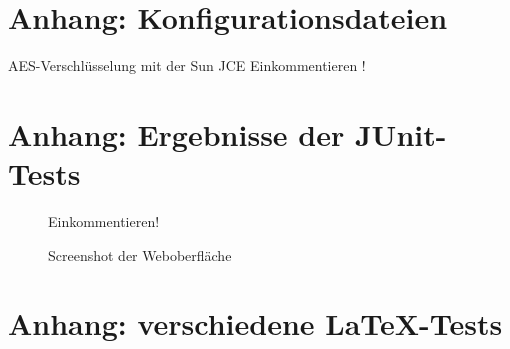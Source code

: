 \documentclass[12pt,oneside,a4paper,bibtotoc,liststotoc,pointlessnumbers]{scrartcl}
\begin{document}
\begin{appendix}



\section{Anhang: Konfigurationsdateien}
AES-Verschlüsselung mit der Sun JCE
Einkommentieren !
%
%
%


\newpage


\section{Anhang: Ergebnisse der JUnit-Tests}
\begin{figure}[h]					
\centering
Einkommentieren!
\caption{Screenshot der Weboberfläche}		%
\label{fig:Fabrikmethode}							%
\end{figure} 	\vspace{-12pt}

\newpage



\newpage
\section{Anhang: verschiedene LaTeX-Tests}


\end{appendix}
\end{document}
